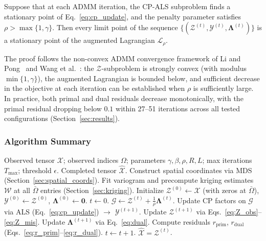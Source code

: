 \documentclass[journal]{IEEEtran}
\newcommand{\Xcal}{\mathcal{X}}
\newcommand{\Zcal}{\mathcal{Z}}
\newcommand{\Ycal}{\mathcal{Y}}
\newcommand{\Wcal}{\mathcal{W}}
\newcommand{\Gcal}{\mathcal{G}}
\newcommand{\Lcal}{\mathcal{L}}
\newcommand{\Omegaobs}{\Omega}
\newcommand{\Omegamis}{\bar{\Omega}}
\begin{document}
\begin{theorem}\label{thm:convergence}
Suppose that at each ADMM iteration, the CP-ALS subproblem finds a stationary point of Eq.~\eqref{eq:cp_update}, and the penalty parameter satisfies $\rho > \max\{1, \gamma\}$. Then every limit point of the sequence $\{(\Zcal^{(t)}, \Ycal^{(t)}, \boldsymbol{\Lambda}^{(t)})\}$ is a stationary point of the augmented Lagrangian $\Lcal_\rho$.
\end{theorem}

The proof follows the non-convex ADMM convergence framework of Li and Pong~\cite{boyd2011distributed} and Wang et al.~\cite{wang2023guaranteed}: the $\Zcal$-subproblem is strongly convex (with modulus $\min\{1, \gamma\}$), the augmented Lagrangian is bounded below, and sufficient decrease in the objective at each iteration can be established when $\rho$ is sufficiently large. In practice, both primal and dual residuals decrease monotonically, with the primal residual dropping below $0.1$ within 27--51 iterations across all tested configurations (Section~\ref{sec:results}).

\subsubsection{Algorithm Summary}

\begin{algorithm}[htbp]
\caption{ADMM-2B: Joint Kriging and Tensor Decomposition}
\label{alg:admm2b}
\begin{algorithmic}[1]
\REQUIRE Observed tensor $\Xcal$; observed indices $\Omegaobs$; parameters $\gamma, \beta, \rho, R, L$; max iterations $T_{\max}$; threshold $\epsilon$.
\ENSURE Completed tensor $\hat{\Xcal}$.
\STATE Construct spatial coordinates via MDS (Section~\ref{sec:spatial_coords}).
\STATE Fit variogram and precompute kriging estimates $\Wcal$ at all $\Omegamis$ entries (Section~\ref{sec:kriging}).
\STATE Initialize $\Zcal^{(0)} \leftarrow \Xcal$ (with zeros at $\Omegamis$), $\Ycal^{(0)} \leftarrow \Zcal^{(0)}$, $\boldsymbol{\Lambda}^{(0)} \leftarrow \mathbf{0}$.
\STATE $t \leftarrow 0$.
\STATE $\Gcal \leftarrow \Zcal^{(t)} + \frac{1}{\rho}\boldsymbol{\Lambda}^{(t)}$.
\STATE Update CP factors on $\Gcal$ via ALS (Eq.~\ref{eq:cp_update}) $\rightarrow$ $\Ycal^{(t+1)}$.
\STATE Update $\Zcal^{(t+1)}$ via Eqs.~\eqref{eq:Z_obs}--\eqref{eq:Z_mis}.
\STATE Update $\boldsymbol{\Lambda}^{(t+1)}$ via Eq.~\eqref{eq:dual}.
\STATE Compute residuals $r_{\mathrm{prim}}$, $r_{\mathrm{dual}}$ (Eqs.~\ref{eq:r_prim}--\ref{eq:r_dual}).
\STATE $t \leftarrow t + 1$.
\ENDWHILE
\RETURN $\hat{\Xcal} = \Zcal^{(t)}$.
\end{algorithmic}
\end{algorithm}
\end{document}
